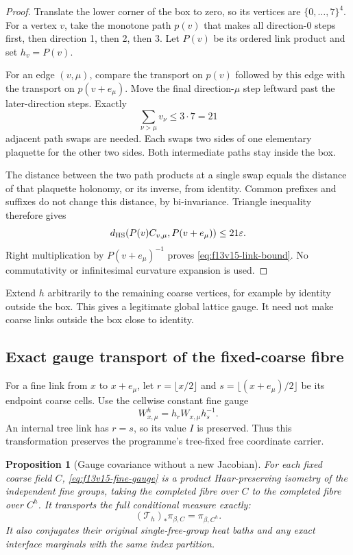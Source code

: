 \documentclass[11pt,oneside]{article}
\newtheorem{proposition}[theorem]{Proposition}
\begin{document}
\begin{proof}
Translate the lower corner of the box
to zero, so its vertices are
\(\{0,\ldots,7\}^4\). For a vertex
\(v\), take the monotone path
\(p(v)\) that makes all direction-0
steps first, then direction 1, then
2, then 3. Let \(P(v)\) be its ordered
link product and set \(h_v=P(v)\).

For an edge \((v,\mu)\), compare
the transport on \(p(v)\) followed
by this edge with the transport
on \(p(v+e_\mu)\). Move the final
direction-\(\mu\) step leftward
past the later-direction steps.
Exactly
\[
                      \sum_{\nu>\mu}v_\nu\le3\cdot7=21
\]
adjacent path swaps are needed.
Each swaps two sides of one
elementary plaquette for the other
two sides. Both intermediate paths
stay inside the box.

The distance between the two path
products at a single swap equals
the distance of that plaquette
holonomy, or its inverse, from
identity. Common prefixes and
suffixes do not change this
distance, by bi-invariance.
Triangle inequality therefore gives
\[
 d_{\rm HS}(P(v)C_{v,\mu},P(v+e_\mu))
                                    \le21\varepsilon .
\]
Right multiplication by
\(P(v+e_\mu)^{-1}\) proves
\eqref{eq:f13v15-link-bound}.
No commutativity or infinitesimal
curvature expansion is used.
\end{proof}

Extend \(h\) arbitrarily to the
remaining coarse vertices, for
example by identity outside the
box. This gives a legitimate
global lattice gauge. It need
not make coarse links outside
the box close to identity.

\subsection{Exact gauge transport of the fixed-coarse fibre}

For a fine link from \(x\) to
\(x+e_\mu\), let
\(r=\lfloor x/2\rfloor\) and
\(s=\lfloor(x+e_\mu)/2\rfloor\)
be its endpoint coarse cells.
Use the cellwise constant fine
gauge
\begin{equation}\label{eq:f13v15-fine-gauge}
                         W^h_{x,\mu}=h_rW_{x,\mu}h_s^{-1}.
\end{equation}
An internal tree link has \(r=s\),
so its value \(I\) is preserved.
Thus this transformation preserves
the programme's tree-fixed free
coordinate carrier.

\begin{proposition}[Gauge covariance without a new Jacobian]
\label{prop:f13v15-conjugacy}
For each fixed coarse field \(C\),
\eqref{eq:f13v15-fine-gauge} is a
product Haar-preserving isometry
of the independent fine groups,
taking the completed fibre over
\(C\) to the completed fibre over
\(C^h\). It transports the full
conditional measure exactly:
\[
                         (\mathcal T_h)_*\pi_{\beta,C}
                                          =\pi_{\beta,C^h}.
\]
It also conjugates their original
single-free-group heat baths and
any exact interface marginals
with the same index partition.
\end{proposition}
\end{document}
